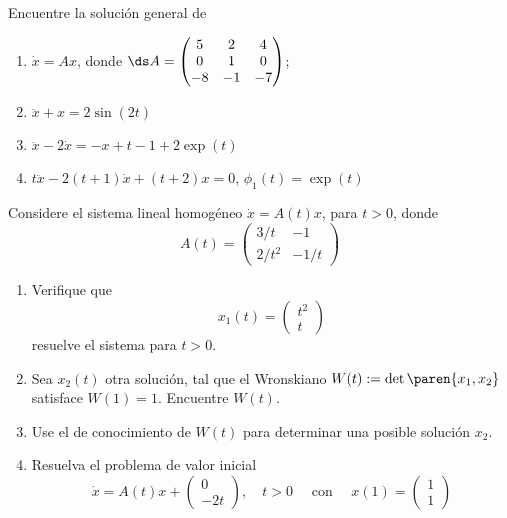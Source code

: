 \documentclass{homework}
\begin{document}
\begin{sol}
    
\end{sol}

\begin{prob}
    Encuentre la solución general de
    \begin{enumerate}[label=(\alph*)]
        \item \(\dot{x}=Ax\), donde \(\ds A=\begin{pmatrix}
            5&2&4\\0&1&0\\-8&-1&-7
        \end{pmatrix}\);
        \item \(\ddot{x}+x=2\sin(2t)\)
        \item \(\ddot{x}-2\dot{x}=-x+t-1+2\exp(t)\)
        \item \(t\ddot{x}-2(t+1)\dot{x}+(t+2)x=0\), \(\phi_1(t)=\exp(t)\)
    \end{enumerate}
\end{prob}

\begin{sol}
    
\end{sol}

\begin{prob}
    Considere el sistema lineal homogéneo \(\dot{x}=A(t)x\), para \(t>0\), donde
    \[A(t)=\begin{pmatrix}
        3/t&-1\\2/t^2&-1/t
    \end{pmatrix}\]
    \begin{enumerate}[label=(\alph*)]
        \item Verifique que
        \[x_1(t)=\begin{pmatrix}
            t^2\\t
        \end{pmatrix}\]
        resuelve el sistema para \(t>0\).
        \item Sea \(x_2(t)\) otra solución, tal que el Wronskiano \(W(t):=\det\paren{x_1,x_2}\) satisface \(W(1)=1\). Encuentre \(W(t)\).
        \item Use el de conocimiento de \(W(t)\) para determinar una posible solución \(x_2\).
        \item Resuelva el problema de valor inicial
        \[\dot{x}=A(t)x+\begin{pmatrix}
            0\\-2t
        \end{pmatrix},\quad t>0\quad\text{ con }\quad x(1)=\begin{pmatrix}
            1\\1
        \end{pmatrix}\]
    \end{enumerate}
\end{prob}
\end{document}
